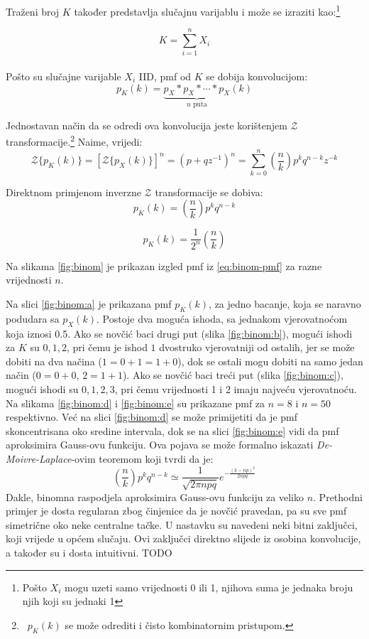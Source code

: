 Traženi broj $K$ također predstavlja slučajnu varijablu i može se izraziti
kao:\footnote{Pošto $X_i$ mogu uzeti samo vrijednosti 0 ili 1, njihova suma je
jednaka broju njih koji su jednaki 1}

$$K = \sum_{i=1}^{n} X_i$$
\\

Pošto su slučajne varijable $X_i$ IID, pmf od $K$ se dobija konvolucijom:
$$p_K(k) = \underbrace{p_X * p_X * \cdots * p_X}_{n\text{ puta}}(k)$$

Jednostavan način da se odredi ova konvolucija jeste korištenjem
$\mathcal{Z}$ transformacije.\footnote{\ $p_K(k)$ se može odrediti i čisto
kombinatornim pristupom.}
Naime, vrijedi: %
\begin{equation}
  \mathcal{Z}\{p_K(k)\}
  = \left[\mathcal{Z}\{p_X(k)\}\right]^n
  = (p+qz^{-1})^n
  = \sum_{k=0}^{n} \left(\frac{n}{k}\right) p^k q^{n-k} z^{-k}
\end{equation}

Direktnom primjenom inverzne $ \mathcal{Z}$ transformacije se dobiva:
$$p_K(k) = \left(\frac{n}{k}\right) p^kq^{n-k}$$

\begin{equation} \label{eq:binom-pmf}
  p_K(k) = \frac{1}{2^n} \left(\frac{n}{k}\right)
\end{equation}

Na slikama \ref{fig:binom} je prikazan izgled pmf iz \eqref{eq:binom-pmf} za
razne vrijednosti $n$.

Na slici \ref{fig:binom:a} je prikazana pmf $p_K(k)$, za jedno bacanje, koja se
naravno podudara sa $p_X(k)$. Postoje dva moguća ishoda, sa jednakom
vjerovatnoćom koja iznosi 0.5. Ako se novčić baci drugi put (slika
\ref{fig:binom:b}), mogući ishodi za $K$ su $0, 1, 2$, pri čemu je ishod $1$
dvostruko vjerovatniji od ostalih, jer se može dobiti na dva načina
($1=0+1=1+0$), dok se ostali mogu dobiti na samo jedan način ($0=0+0$, $2=1+1$).
Ako se novčić baci treći put (slika \ref{fig:binom:c}), mogući ishodi su
$0,1,2,3$, pri čemu vrijednosti 1 i 2 imaju najveću vjerovatnoću. Na slikama
\ref{fig:binom:d} i \ref{fig:binom:e} su prikazane pmf za $n=8$ i $n=50$
respektivno. Već na slici \ref{fig:binom:d} se može primijetiti da je pmf
skoncentrisana oko sredine intervala, dok se na slici \ref{fig:binom:e} vidi da
pmf aproksimira Gauss-ovu funkciju. Ova pojava se može formalno iskazati
\textit{De-Moivre-Laplace}-ovim teoremom koji tvrdi da je:
\begin{equation}
  \left(\frac{n}{k}\right) p^kq^{n-k} \simeq \frac{1}{\sqrt{2\pi npq}}
  e^{-\frac{(k-np)^2}{2npq}}
\end{equation}
Dakle, binomna raspodjela aproksimira Gauss-ovu funkciju za veliko $n$.
Prethodni primjer je dosta regularan zbog činjenice da je novčić pravedan, pa su
sve pmf simetrične oko neke centralne tačke. U nastavku su navedeni neki bitni
zaključci, koji vrijede u općem slučaju. Ovi zaključci direktno slijede iz
osobina konvolucije, a također su i dosta intuitivni.
TODO

